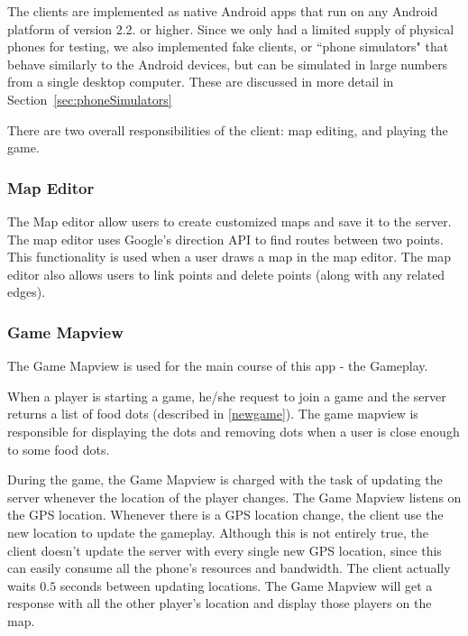 \documentclass{acm_proc_article-sp}
\begin{document}
The clients are implemented as native Android apps that run on any
Android platform of version 2.2. or higher.  Since we only had a limited
supply of physical phones for testing, we also implemented fake clients,
or ``phone simulators" that behave similarly to the Android devices, but
can be simulated in large numbers from a single desktop computer. These
are discussed in more detail in Section~\ref{sec:phoneSimulators}

There are two overall responsibilities of the client: map editing,
and playing the game.

\subsubsection{Map Editor}
The Map editor allow users to create customized maps and save it to
the server. The map editor uses Google's direction API
\cite{GoogleDirection} to find routes between two points. This
functionality is used when a user draws a map in the map editor. The
map editor also allows users to link points and delete points (along
with any related edges).


\subsubsection{Game Mapview}
The Game Mapview is used for the main course of this app - the
Gameplay. 

When a player is starting a game, he/she request to join a game and
the server returns a list of food dots (described in
\ref{newgame}). The game mapview is responsible for displaying the
dots and removing dots when a user is close enough to some food dots.

During the game, the Game Mapview is charged with the task of updating
the server whenever the location of the player changes. The Game
Mapview listens on the GPS location. Whenever there is a GPS location
change, the client use the new location to update the
gameplay. Although this is not entirely true, the client doesn't
update the server with every single new GPS location, since this can
easily consume all the phone's resources and bandwidth. The client
actually waits $0.5$ seconds between updating locations. The Game
Mapview will get a response with all the other player's location and
display those players on the map.
\end{document}
